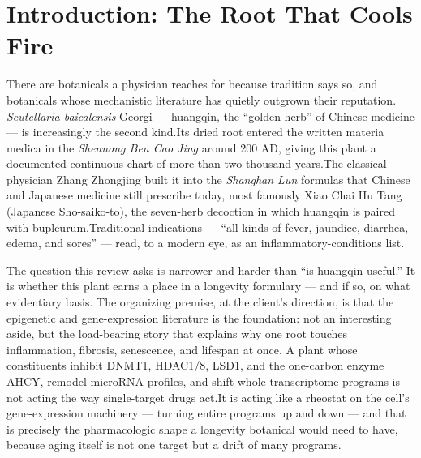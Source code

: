 \documentclass[11pt]{article}
\newcommand{\src}[1]{\allowbreak[#1]}
\begin{document}
\begin{abstract}
reduced 47\% via OATP1B1). The paper closes with the formulary view: what a naturopathic physician can defensibly say, prescribe, and monitor today, and the five studies that would move this plant from mechanistically credible toward clinically proven as a longevity botanical.
\end{abstract}

\section{Introduction: The Root That Cools Fire}

There are botanicals a physician reaches for because tradition says so, and botanicals whose mechanistic literature has quietly outgrown their reputation. \textit{Scutellaria baicalensis} Georgi --- huangqin, the ``golden herb'' of Chinese medicine --- is increasingly the second kind.\src{81} Its dried root entered the written materia medica in the \textit{Shennong Ben Cao Jing} around 200 AD, giving this plant a documented continuous chart of more than two thousand years.\src{101} The classical physician Zhang Zhongjing built it into the \textit{Shanghan Lun} formulas that Chinese and Japanese medicine still prescribe today, most famously Xiao Chai Hu Tang (Japanese Sho-saiko-to), the seven-herb decoction in which huangqin is paired with bupleurum.\src{81}\src{93} Traditional indications --- ``all kinds of fever, jaundice, diarrhea, edema, and sores'' --- read, to a modern eye, as an inflammatory-conditions list.\src{54}

The question this review asks is narrower and harder than ``is huangqin useful.'' It is whether this plant earns a place in a longevity formulary --- and if so, on what evidentiary basis. The organizing premise, at the client's direction, is that the epigenetic and gene-expression literature is the foundation: not an interesting aside, but the load-bearing story that explains why one root touches inflammation, fibrosis, senescence, and lifespan at once. A plant whose constituents inhibit DNMT1, HDAC1/8, LSD1, and the one-carbon enzyme AHCY, remodel microRNA profiles, and shift whole-transcriptome programs is not acting the way single-target drugs act.\src{142}\src{131}\src{117}\src{156} It is acting like a rheostat on the cell's gene-expression machinery --- turning entire programs up and down --- and that is precisely the pharmacologic shape a longevity botanical would need to have, because aging itself is not one target but a drift of many programs.\src{109}
\end{document}
